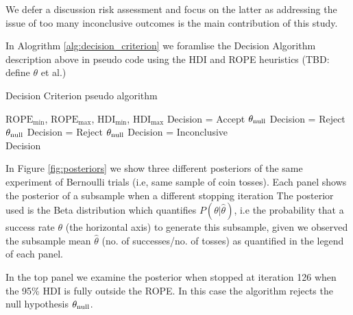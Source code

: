We defer a discussion risk assessment and focus on the latter as
addressing the issue of too many inconclusive outcomes is the main contribution of this study.


In Alogrithm \ref{alg:decision_criterion} we foramlise the Decision Algorithm description
above in pseudo code using the HDI and ROPE heuristics (TBD: define $\theta$ et al.)

\begin{algorithm}
    \caption{Decision Criterion pseudo algorithm}\label{alg:decision_criterion}
    \begin{algorithmic}
    \Require $\mathrm{ROPE}_\mathrm{min}$, $\mathrm{ROPE}_\mathrm{max}$, $\mathrm{HDI}_\mathrm{min}$, $\mathrm{HDI}_\mathrm{max}$
        \State Decision = Accept $\theta_{\rm null}$ 
        \State Decision = Reject $\theta_{\rm null}$ 
        \State Decision = Reject $\theta_{\rm null}$ 
    \Else
    \State Decision = Inconclusive  
    \EndIf \\
    \Return Decision
    \end{algorithmic} 
    
\end{algorithm}

In Figure \ref{fig:posteriors} we show three different posteriors of the same experiment of Bernoulli
trials (i.e, same sample of coin tosses). %
Each panel shows the posterior of a subsample when a different stopping iteration
The posterior used is the Beta distribution which quantifies $P(\theta|\hat{\theta})$,
i.e the probability that a
success rate $\theta$ (the horizontal axis) to generate this subsample,
given we observed the subsample mean $\hat\theta$ (no. of successes/no. of tosses)
as quantified in the legend of each panel.

In the top panel we examine the posterior
when stopped at iteration 126 when the 95\% HDI is fully outside the ROPE.
In this case the algorithm %
rejects the null hypothesis $\theta_{\rm null}$.

